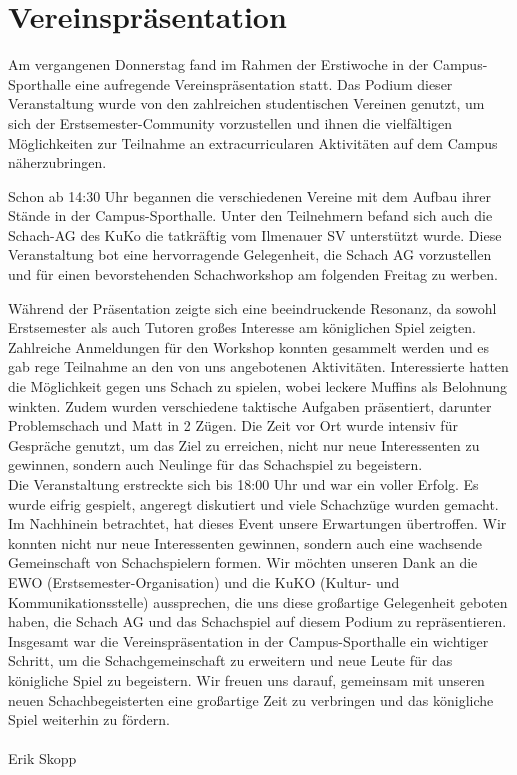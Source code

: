\documentclass[a4paper,german]{tui-algo-seminar}
\title{\inhalt}
\author{Erik Skopp}
\begin{document}
\maketitle
\thispagestyle{plain} %
\begin{abstract}
Bericht über die Vereinspräsentation des Ilmenauer SV's im Rahmen der Erstiwoche des Wintersemesters 2023 / 2024.
\end{abstract}

\section{Vereinspräsentation}
Am vergangenen Donnerstag fand im Rahmen der Erstiwoche in der Campus-Sporthalle eine aufregende Vereinspräsentation statt. Das Podium dieser Veranstaltung wurde von den zahlreichen studentischen Vereinen genutzt, um sich der Erstsemester-Community vorzustellen und ihnen die vielfältigen Möglichkeiten zur Teilnahme an extracurricularen Aktivitäten auf dem Campus näherzubringen.

Schon ab 14:30 Uhr begannen die verschiedenen Vereine mit dem Aufbau ihrer Stände in der Campus-Sporthalle. Unter den Teilnehmern befand sich auch die Schach-AG des KuKo die tatkräftig vom Ilmenauer SV unterstützt wurde. Diese Veranstaltung bot eine hervorragende Gelegenheit, die Schach AG vorzustellen und für einen bevorstehenden Schachworkshop am folgenden Freitag zu werben.

Während der Präsentation zeigte sich eine beeindruckende Resonanz, da sowohl Erstsemester als auch Tutoren großes Interesse am königlichen Spiel zeigten. Zahlreiche Anmeldungen für den Workshop konnten gesammelt werden und es gab rege Teilnahme an den von uns angebotenen Aktivitäten. Interessierte hatten die Möglichkeit gegen uns Schach zu spielen, wobei leckere Muffins als Belohnung winkten. Zudem wurden verschiedene taktische Aufgaben präsentiert, darunter Problemschach und Matt in 2 Zügen. Die Zeit vor Ort wurde intensiv für Gespräche genutzt, um das Ziel zu erreichen, nicht nur neue Interessenten zu gewinnen, sondern auch Neulinge für das Schachspiel zu begeistern.\\
Die Veranstaltung erstreckte sich bis 18:00 Uhr und war ein voller Erfolg. Es wurde eifrig gespielt, angeregt diskutiert und viele Schachzüge wurden gemacht. Im Nachhinein betrachtet, hat dieses Event unsere Erwartungen übertroffen. Wir konnten nicht nur neue Interessenten gewinnen, sondern auch eine wachsende Gemeinschaft von Schachspielern formen. Wir möchten unseren Dank an die EWO (Erstsemester-Organisation) und die KuKO (Kultur- und Kommunikationsstelle) aussprechen, die uns diese großartige Gelegenheit geboten haben, die Schach AG und das Schachspiel auf diesem Podium zu repräsentieren.\\
Insgesamt war die Vereinspräsentation in der Campus-Sporthalle ein wichtiger Schritt, um die Schachgemeinschaft zu erweitern und neue Leute für das königliche Spiel zu begeistern. Wir freuen uns darauf, gemeinsam mit unseren neuen Schachbegeisterten eine großartige Zeit zu verbringen und das königliche Spiel weiterhin zu fördern.\\
\\
Erik Skopp
\end{document}
